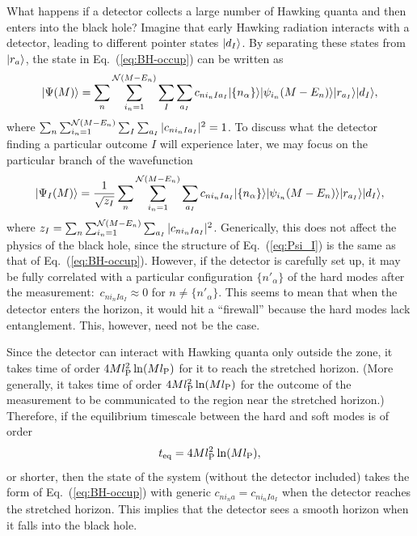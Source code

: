\documentclass[12pt]{article}
\begin{document}
What happens if a detector collects a large number of Hawking quanta 
and then enters into the black hole?  Imagine that early Hawking 
radiation interacts with a detector, leading to different pointer 
states $| d_I \rangle$.  By separating these states from $| r_a \rangle$, 
the state in Eq.~(\ref{eq:BH-occup}) can be written as
%
\begin{equation}
  \ket{\Psi(M)} = \sum_n \sum_{i_n = 1}^{{\cal N}(M-E_n)} 
    \sum_I \sum_{a_I} c_{n i_n I a_I} \ket{\{ n_\alpha \}} 
    \ket{\psi_{i_n}(M-E_n)} \ket{r_{a_I}} \ket{d_I},
\label{eq:BH-occup-2}
\end{equation}
%
where $\sum_n \sum_{i_n = 1}^{{\cal N}(M-E_n)} \sum_I \sum_{a_I} 
|c_{n i_n I a_I}|^2 = 1$.  To discuss what the detector finding 
a particular outcome $I$ will experience later, we may focus on 
the particular branch of the wavefunction
%
\begin{equation}
  \ket{\Psi_I(M)} = \frac{1}{\sqrt{z_I}} \sum_n 
    \sum_{i_n = 1}^{{\cal N}(M-E_n)} \sum_{a_I} c_{n i_n I a_I} 
    \ket{\{n_\alpha\}} \ket{\psi_{i_n}(M-E_n)} \ket{r_{a_I}} \ket{d_I},
\label{eq:Psi_I}
\end{equation}
%
where $z_I = \sum_n \sum_{i_n = 1}^{{\cal N}(M-E_n)} \sum_{a_I} 
|c_{n i_n I a_I}|^2$.  Generically, this does not affect the physics 
of the black hole, since the structure of Eq.~(\ref{eq:Psi_I}) 
is the same as that of Eq.~(\ref{eq:BH-occup}).  However, if 
the detector is carefully set up, it may be fully correlated 
with a particular configuration $\{ n'_\alpha \}$ of the hard 
modes after the measurement:\ $c_{n i_n I a_I} \approx 0$ for 
$n \neq \{ n'_\alpha \}$.  This seems to mean that when the detector 
enters the horizon, it would hit a ``firewall'' because the hard 
modes lack entanglement.  This, however, need not be the case.

Since the detector can interact with Hawking quanta only outside the 
zone, it takes time of order $4M l_{\rm P}^2 \ln(M l_{\rm P})$ for 
it to reach the stretched horizon.  (More generally, it takes time 
of order $4M l_{\rm P}^2 \ln(M l_{\rm P})$ for the outcome of the 
measurement to be communicated to the region near the stretched 
horizon.)  Therefore, if the equilibrium timescale between the hard 
and soft modes is of order
%
\begin{equation}
  t_{\rm eq} = 4Ml_{\rm P}^2 \ln(Ml_{\rm P}),
\label{eq:t_eq}
\end{equation}
%
or shorter, then the state of the system (without the detector 
included) takes the form of Eq.~(\ref{eq:BH-occup}) with generic 
$c_{n i_n a} = c_{n i_n I a_I}$ when the detector reaches the 
stretched horizon.  This implies that the detector sees a smooth 
horizon when it falls into the black hole.
\end{document}
